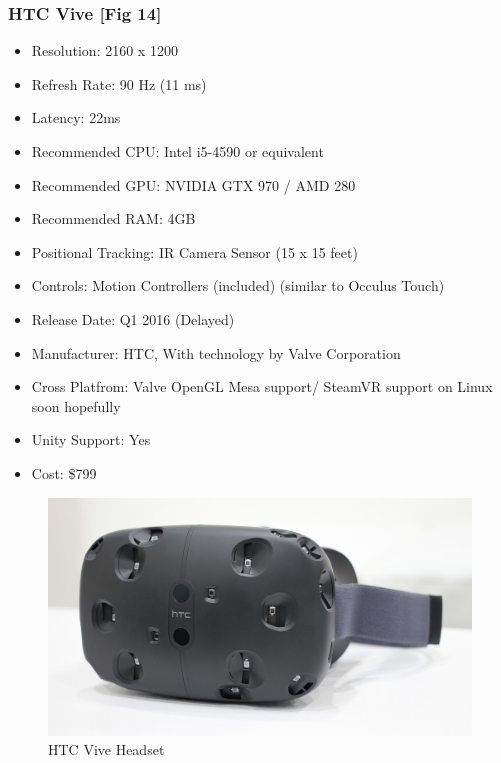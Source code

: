 \documentclass[a4paper,10pt]{article}
\begin{document}
\subsubsection{HTC Vive [Fig 14]}
	\begin{itemize}
	  \item Resolution: 2160 x 1200
	  \item Refresh Rate: 90 Hz (11 ms)
	  \item Latency: 22ms
	  \item Recommended CPU: Intel i5-4590 or equivalent
	  \item Recommended GPU: NVIDIA GTX 970 / AMD 280 
	  \item Recommended RAM: 4GB
	  \item Positional Tracking: IR Camera Sensor (15 x 15 feet)
	  \item Controls: Motion Controllers (included) (similar to Occulus Touch)  
	  \item Release Date: Q1 2016 (Delayed)
	  \item Manufacturer: HTC, With technology by Valve Corporation
	  \item Cross Platfrom: Valve OpenGL Mesa support/ SteamVR support on Linux soon hopefully
	  \item Unity Support: Yes
	  \item Cost: \$799
	\end{itemize}
	\begin{figure}[H]
	\includegraphics[width=\linewidth,height=\paperheight,keepaspectratio]{vive.jpg}
	\caption{HTC Vive Headset}
	\label{fig:ViveImg}
	\end{figure}
	\pagebreak
\end{document}
